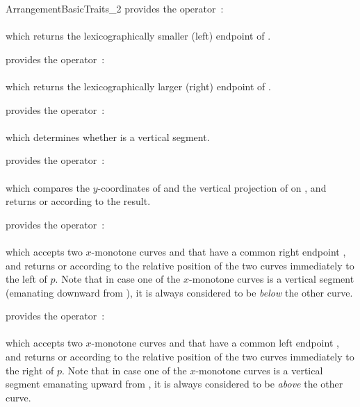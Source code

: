 \begin{ccRefConcept}{ArrangementBasicTraits_2}
{provides the operator~: \\
  \\
 which returns the lexicographically smaller (left) endpoint of .}

{provides the operator~: \\
  \\
 which returns the lexicographically larger (right) endpoint of .}

{provides the operator~: \\
  \\
 which determines whether  is a vertical segment.}

{provides the operator~: \\
  \\
 which compares the $y$-coordinates of  and the vertical projection
 of  on , and returns  or 
 according to the result.}

{provides the operator~: \\
  \\
 which accepts two $x$-monotone curves  and  that have
 a common right endpoint , and returns  or
  according to the relative position of the two curves
 immediately to the left of $p$. Note that in case one of the $x$-monotone
 curves is a vertical segment (emanating downward from ), it is always
 considered to be {\sl below} the other curve.}

{provides the operator~: \\
  \\
 which accepts two $x$-monotone curves  and  that have
 a common left endpoint , and returns  or
  according to the relative position of the two curves
 immediately to the right of $p$. Note that in case one of the $x$-monotone
 curves is a vertical segment emanating upward from , it is always
 considered to be {\sl above} the other curve.}


\end{ccRefConcept}
